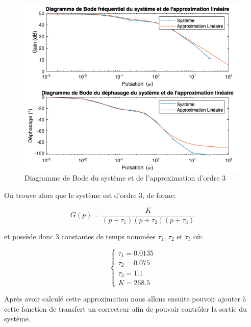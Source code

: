\documentclass[12pt]{report}
\begin{document}
\begin{figure}[!h]
  \centering
  \includegraphics[scale=0.7]{fig/bode_diagram.png}
  \caption{Diagramme de Bode du système et de l'approximation d'ordre 3}
  \vspace{0.5cm}
\end{figure}

On trouve alors que le système est d'ordre 3, de forme:

\vspace{0.5cm}
\begin{equation}
  G(p) = \frac{K}{(p + \tau_1)(p + \tau_2)(p + \tau_3)}
\end{equation}
\vspace{0.5cm}

et possède donc 3 constantes de temps nommées
$\tau_1$, $\tau_2$ et $\tau_3$ où:

\vspace{0.5cm}
\begin{equation}
  \left\{
  \begin{matrix}
    \tau_1 = 0.0135 \\
    \tau_2 = 0.075 \\
    \tau_3 = 1.1 \\
    K = 268.5
  \end{matrix}
  \right.
\end{equation}
\vspace{0.5cm}

Après avoir calculé cette approximation nous allons ensuite pouvoir ajouter à cette fonction de
transfert un correcteur afin de pouvoir contrôler la sortie du système.
\end{document}
